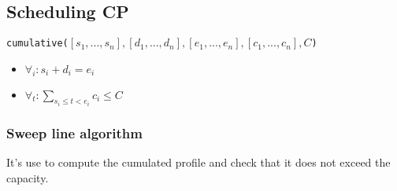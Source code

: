 \subsection{Scheduling CP}

\begin{center}
    \texttt{cumulative($[s_1,..., s_n], [d_1, ..., d_n], [e_1, ...,
    e_n], [c_1, ..., c_n], C$)}
\end{center}

\begin{itemize}
    \item $\forall_i: s_i + d_i = e_i$
    \item $\forall_t: \sum_{s_i \leq t < e_i} c_i \leq C$
\end{itemize}

\subsubsection{Sweep line algorithm}
It's use to compute the cumulated
profile and check that it does not exceed the capacity.


